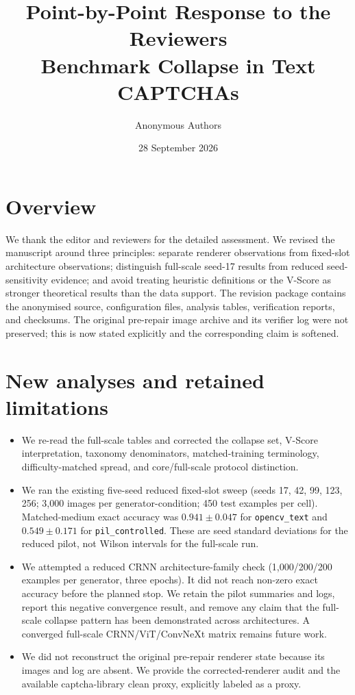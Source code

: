 \documentclass[11pt]{article}
\title{Point-by-Point Response to the Reviewers\\[4pt]\large Benchmark Collapse in Text CAPTCHAs}
\author{Anonymous Authors}
\date{28 September 2026}
\begin{document}
\maketitle
\section*{Overview}
We thank the editor and reviewers for the detailed assessment. We revised the manuscript around three principles: separate renderer observations from fixed-slot architecture observations; distinguish full-scale seed-17 results from reduced seed-sensitivity evidence; and avoid treating heuristic definitions or the V-Score as stronger theoretical results than the data support. The revision package contains the anonymised source, configuration files, analysis tables, verification reports, and checksums. The original pre-repair image archive and its verifier log were not preserved; this is now stated explicitly and the corresponding claim is softened.

\section*{New analyses and retained limitations}
\begin{itemize}
\item We re-read the full-scale tables and corrected the collapse set, V-Score interpretation, taxonomy denominators, matched-training terminology, difficulty-matched spread, and core/full-scale protocol distinction.
\item We ran the existing five-seed reduced fixed-slot sweep (seeds 17, 42, 99, 123, 256; 3,000 images per generator-condition; 450 test examples per cell). Matched-medium exact accuracy was $0.941\pm0.047$ for \texttt{opencv\_text} and $0.549\pm0.171$ for \texttt{pil\_controlled}. These are seed standard deviations for the reduced pilot, not Wilson intervals for the full-scale run.
\item We attempted a reduced CRNN architecture-family check (1,000/200/200 examples per generator, three epochs). It did not reach non-zero exact accuracy before the planned stop. We retain the pilot summaries and logs, report this negative convergence result, and remove any claim that the full-scale collapse pattern has been demonstrated across architectures. A converged full-scale CRNN/ViT/ConvNeXt matrix remains future work.
\item We did not reconstruct the original pre-repair renderer state because its images and log are absent. We provide the corrected-renderer audit and the available captcha-library clean proxy, explicitly labeled as a proxy.
\end{itemize}
\end{document}

